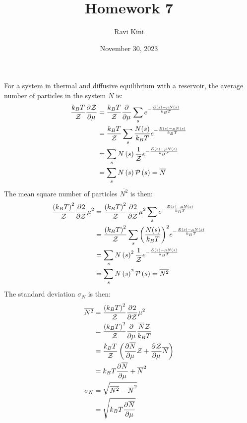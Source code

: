 \documentclass{article}
\title{Homework 7}
\author{Ravi Kini}
\date{November 30, 2023}
\begin{document}
\maketitle

For a system in thermal and diffusive equilibrium with a reservoir,  the average number of particles in the system $\overline{N}$ is:
\begin{equation}
    \begin{split}
        \frac{k_BT}{\mathcal{Z}}\frac{\partial^{}\mathcal{Z}} {\partial \mu^{}} & = \frac{k_BT}{\mathcal{Z}}\frac{\partial^{} } {\partial  \mu^{}}\sum_s e^{-\frac{E\left(s\right) -\mu N\left(s\right)}{k_BT}} \\
        & = \frac{k_BT}{\mathcal{Z}}\sum_s \frac{N(s)}{k_BT} e^{-\frac{E(s) - \mu N(s)}{k_BT}} \\
        & = \sum_s N\left(s\right) \frac{1}{\mathcal{Z}}e^{-\frac{E\left(s\right) - \mu N\left(s\right)}{k_BT}} \\
        & = \sum_s N\left(s\right)\mathcal{P}\left(s\right) = \overline{N} \\
    \end{split}
\end{equation}
The mean square number of particles $\overline{N^2}$ is then:
\begin{equation}
    \begin{split}
        \frac{{\left(k_BT\right)}^2}{\mathcal{Z}}\frac{\partial^{}2} {\partial \mathcal{Z}^{}}{\mu^2} & = \frac{{\left(k_BT\right)}^2}{\mathcal{Z}}\frac{\partial^{}2} {\partial \mathcal{Z}^{}}{\mu^2}\sum_s e^{-\frac{E\left(s\right) -\mu N\left(s\right)}{k_BT}} \\
        & = \frac{{\left(k_BT\right)}^2}{\mathcal{Z}}\sum_s {\left(\frac{N(s)}{k_BT}\right)}^2 e^{-\frac{E\left(s\right) - \mu N\left(s\right)}{k_BT}} \\
        & = \sum_s N\left(s\right)^2 \frac{1}{\mathcal{Z}}e^{-\frac{E\left(s\right) - \mu N\left(s\right)}{k_BT}} \\
        & = \sum_s N\left(s\right)^2\mathcal{P}\left(s\right) = \overline{N^2} \\
    \end{split}
\end{equation}
The standard deviation $\sigma_N$ is then:
\begin{equation}
    \begin{split}
        \overline{N^2} & = \frac{{\left(k_BT\right)}^2}{\mathcal{Z}}\frac{\partial^{}2} {\partial \mathcal{Z}^{}}{ \mu^2} \\
        & = \frac{{\left(k_BT\right)}^2}{\mathcal{Z}}\frac{\partial^{} } {\partial  \mu^{}}\frac{\overline{N}\mathcal{Z}}{k_BT} \\
        & = \frac{k_BT}{\mathcal{Z}}\left(\frac{\partial^{} \overline{N}} {\partial  \mu^{}}\mathcal{Z} + \frac{\partial^{}\mathcal{Z}} {\partial  \mu^{}}\overline{N}\right) \\
        & = k_BT\frac{\partial^{} \overline{N}} {\partial  \mu^{}} + \overline{N}^2 \\
        \sigma_N & = \sqrt{\overline{N^2} - \overline{N}^2} \\
        & = \sqrt{k_BT\frac{\partial^{} \overline{N}} {\partial  \mu^{}}}
    \end{split}
\end{equation}
\end{document}
